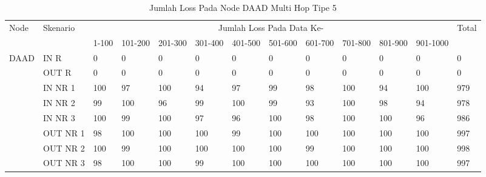 \begin{table}[H]
  \centering
  \caption{Jumlah Loss Pada Node DAAD Multi Hop Tipe 5}
    \begin{tabular}{|p{1cm}|p{1.9cm}|p{0.6cm}|p{0.6cm}|p{0.6cm}|p{0.6cm}|p{0.6cm}|p{0.6cm}|p{0.6cm}|p{0.6cm}|p{0.6cm}|p{0.6cm}|p{1cm}|}
    \hline
        \multirow{2}{*}{Node}&\multirow{2}{*}{Skenario}&\multicolumn{10}{|c|}{Jumlah Loss Pada Data Ke-}&\multirow{2}{*}{Total} \\\cline{3-12}
          & & 1-100 & 101-200 & 201-300 & 301-400 & 401-500 & 501-600 & 601-700 & 701-800 & 801-900 & 901-1000 & \\
        \hline
    \multirow{8}{*}{DAAD}  
   & IN R  & 0     & 0     & 0     & 0     & 0     & 0     & 0     & 0     & 0     & 0     & 0 \\
          & OUT R & 0     & 0     & 0     & 0     & 0     & 0     & 0     & 0     & 0     & 0     & 0 \\
          & IN NR 1 & 100   & 97    & 100   & 94    & 97    & 99    & 98    & 100   & 94    & 100   & 979 \\
          & IN NR 2 & 99    & 100   & 96    & 99    & 100   & 99    & 93    & 100   & 98    & 94    & 978 \\
          & IN NR 3 & 100   & 99    & 100   & 97    & 96    & 100   & 98    & 100   & 100   & 96    & 986 \\
          & OUT NR 1 & 98    & 100   & 100   & 100   & 99    & 100   & 100   & 100   & 100   & 100   & 997 \\
          & OUT NR 2 & 100   & 99    & 100   & 100   & 100   & 100   & 99    & 100   & 100   & 100   & 998 \\
          & OUT NR 3 & 98    & 100   & 100   & 99    & 100   & 100   & 100   & 100   & 100   & 100   & 997 \\
        \hline
    \end{tabular}%
  \label{tab:addlabel}%
\end{table}%
